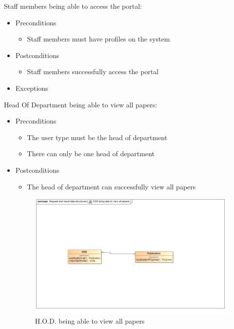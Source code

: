 \documentclass[a4paper,12pt]{article}
\begin{document}
Staff members being able to access the portal:
\begin{itemize}
    \item Preconditions
    \begin{itemize}
        \item Staff members must have profiles on the system
    \end{itemize}
    \item Postconditions
    \begin{itemize}
        \item Staff members successfully access the portal
    \end{itemize}
    \item Exceptions
\end{itemize}
Head Of Department being able to view all papers:
\begin{itemize}
    \item Preconditions
    \begin{itemize}
        \item The user type must be the head of department
        \item There can only be one head of department
    \end{itemize}
    \item Postconditions
    \begin{itemize}
        \item The head of department can successfully view all papers
    \end{itemize}
    
    \begin{figure}[H]
    \centering
    \caption{H.O.D. being able to view all papers}
    \includegraphics[width=1\textwidth]{use-case/hod-viewing-papers.png}
    \end{figure}
\end{itemize}
\end{document}
